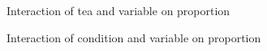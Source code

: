 \documentclass{article}
\begin{document}
\begin{figure}[H]
  \caption{Interaction of tea and variable on proportion}
  \noindent{}
  \centering
\end{figure}

\begin{figure}[H]
  \caption{Interaction of condition and variable on proportion}
  \noindent{}
  \centering
\end{figure}
\end{document}
